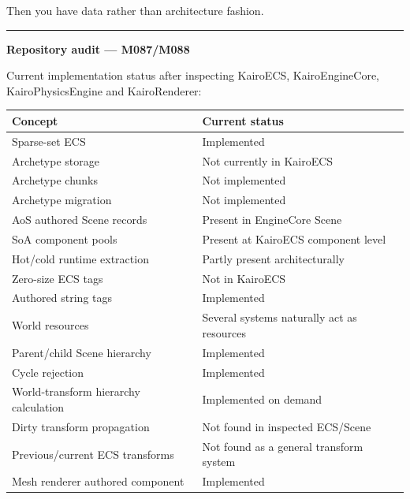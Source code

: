 Then you have data rather than architecture fashion.

\begin{center}\rule{0.5\linewidth}{0.5pt}\end{center}

\textbf{Repository audit --- M087/M088}

Current implementation status after inspecting KairoECS, KairoEngineCore, KairoPhysicsEngine and KairoRenderer:

{\def\LTcaptype{none} %
\begin{longtable}[]{@{}
  >{\raggedright\arraybackslash}p{}
  >{\raggedright\arraybackslash}p{}@{}}
\toprule\noalign{}
\begin{minipage}[b]{\linewidth}\raggedright
Concept
\end{minipage} & \begin{minipage}[b]{\linewidth}\raggedright
Current status
\end{minipage} \\
\midrule\noalign{}
\endhead
\bottomrule\noalign{}
\endlastfoot
Sparse-set ECS & Implemented \\
Archetype storage & Not currently in KairoECS \\
Archetype chunks & Not implemented \\
Archetype migration & Not implemented \\
AoS authored Scene records & Present in EngineCore Scene \\
SoA component pools & Present at KairoECS component level \\
Hot/cold runtime extraction & Partly present architecturally \\
Zero-size ECS tags & Not in KairoECS \\
Authored string tags & Implemented \\
World resources & Several systems naturally act as resources \\
Parent/child Scene hierarchy & Implemented \\
Cycle rejection & Implemented \\
World-transform hierarchy calculation & Implemented on demand \\
Dirty transform propagation & Not found in inspected ECS/Scene \\
Previous/current ECS transforms & Not found as a general transform system \\
Mesh renderer authored component & Implemented \\

\end{longtable}}
